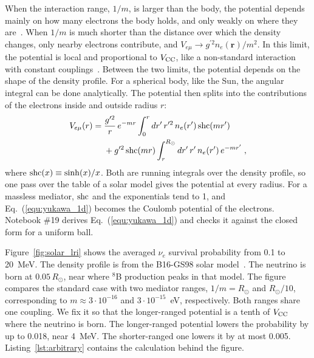 \documentclass[final,5p,times,twocolumn,sort,compress]{elsarticle}
\makeatletter
\newcommand{\eq}{Eq.}
\DeclareRobustCommand{\_}{%
  \ifmmode\nfss@text{\textunderscore}\else\textunderscore\allowbreak\fi}
\newcommand{\equ}[1]{\eq~(\ref{equ:#1})}
\makeatother
\begin{document}
When the interaction range, $1/m$, is larger than the body, the potential depends mainly on how many electrons the body holds, and only weakly on where they are\ \cite{Wise:2018rnb, Bustamante:2018mzu, Agarwalla:2023sng}. When $1/m$ is much shorter than the distance over which the density changes, only nearby electrons contribute, and $V_{e\mu} \to g^{\prime 2} n_e(\mathbf{r})/m^2$. In this limit, the potential is local and proportional to $V_{\rm CC}$, like a non-standard interaction with constant couplings~\cite{Coloma:2020gfv}. Between the two limits, the potential depends on the shape of the density profile. For a spherical body, like the Sun, the angular integral can be done analytically. The potential then splits into the contributions of the electrons inside and outside radius $r$:
\begin{equation}
 \label{equ:yukawa_1d}
 \begin{split}
 V_{e\mu}(r)
 = {} &
 \frac{g^{\prime 2}}{r}\, e^{-m r}
 \int_0^{r} dr^\prime\, r^{\prime 2}\, n_e(r^\prime)\, {\rm shc}(m r^\prime) \\
 & + g^{\prime 2}\, {\rm shc}(m r)
 \int_r^{R_\odot} dr^\prime\, r^\prime\, n_e(r^\prime)\, e^{-m r^\prime} \;,
 \end{split}
\end{equation}
where ${\rm shc}(x) \equiv \sinh(x)/x$. Both are running integrals over the density profile, so one pass over the table of a solar model gives the potential at every radius. For a massless mediator, ${\rm shc}$ and the exponentials tend to 1, and \equ{yukawa_1d} becomes the Coulomb potential of the electrons. Notebook \#19 derives \equ{yukawa_1d} and checks it against the closed form for a uniform ball.

Figure~\ref{fig:solar_lri} shows the averaged $\nu_e$ survival probability from 0.1 to 20~MeV. The density profile is from the B16-GS98 solar model\ \cite{Vinyoles:2016djt}. The neutrino is born at $0.05\,R_\odot$, near where $^8$B production peaks in that model. The figure compares the standard case with two mediator ranges, $1/m = R_\odot$ and $R_\odot/10$, corresponding to $m \approx 3 \cdot 10^{-16}$ and $3 \cdot 10^{-15}$~eV, respectively. Both ranges share one coupling. We fix it so that the longer-ranged potential is a tenth of $V_{\rm CC}$ where the neutrino is born. The longer-ranged potential lowers the probability by up to 0.018, near 4~MeV. The shorter-ranged one lowers it by at most 0.005. Listing~\ref{lst:arbitrary} contains the calculation behind the figure.
\end{document}
